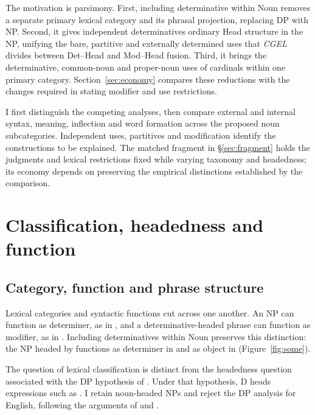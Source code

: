 \documentclass[12pt]{article}
\begin{document}
The motivation is parsimony. First, including determinative within Noun removes a separate primary lexical category and its phrasal projection, replacing DP with NP. Second, it gives independent determinatives ordinary Head structure in the NP, unifying the bare, partitive and externally determined uses that \textit{CGEL} divides between Det--Head and Mod--Head fusion. Third, it brings the determinative, common-noun and proper-noun uses of cardinals within one primary category. Section~\ref{sec:economy} compares these reductions with the changes required in stating modifier and use restrictions.

I first distinguish the competing analyses, then compare external and internal syntax, meaning, inflection and word formation across the proposed noun subcategories. Independent uses, partitives and modification identify the constructions to be explained. The matched fragment in §\ref{sec:fragment} holds the judgments and lexical restrictions fixed while varying taxonomy and headedness; its economy depends on preserving the empirical distinctions established by the comparison.

\section{Classification, headedness and function}\label{sec:alternatives}

\subsection{Category, function and phrase structure}\label{sec:category-function}

Lexical categories and syntactic functions cut across one another. An NP can function as determiner, as in , and a determinative-headed phrase can function as modifier, as in  \citep{payne2010,pullummiller2022nps}. Including determinatives within Noun preserves this distinction: the NP headed by  functions as determiner in  and as object in  (Figure~\ref{fig:some}).

The question of lexical classification is distinct from the headedness question associated with the DP hypothesis of \textcite{abney1987}. Under that hypothesis, D heads expressions such as . I retain noun-headed NPs and reject the DP analysis for English, following the arguments of \textcite{pullummiller2022nps} and \textcite{bruening2020nominal}.
\end{document}

